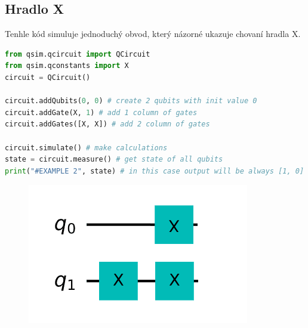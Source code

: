 \documentclass[11pt]{article}
\begin{document}
\subsection{Hradlo X}
Tenhle kód simuluje jednoduchý obvod, který názorné ukazuje chovaní hradla X.
\begin{lstlisting}[language=Python, caption=X gates]
from qsim.qcircuit import QCircuit
from qsim.qconstants import X
circuit = QCircuit()

circuit.addQubits(0, 0) # create 2 qubits with init value 0
circuit.addGate(X, 1) # add 1 column of gates
circuit.addGates([X, X]) # add 2 column of gates

circuit.simulate() # make calculations
state = circuit.measure() # get state of all qubits
print("#EXAMPLE 2", state) # in this case output will be always [1, 0]
\end{lstlisting}
\begin{figure}[H]
    \includegraphics[scale=.5]{multiple_qubits_scheme}
    \centering
\end{figure}
\end{document}
